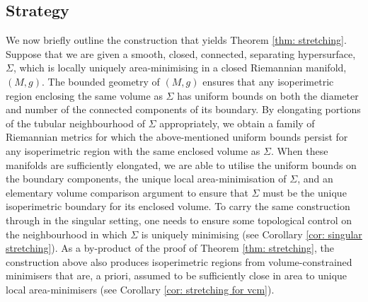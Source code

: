\documentclass[12pt]{article}
\begin{document}
\subsection{Strategy}

We now briefly outline the construction that yields Theorem \ref{thm: stretching}. Suppose that we are given a smooth, closed, connected, separating hypersurface, $\Sigma$, which is locally uniquely area-minimising in a closed Riemannian manifold, $(M,g)$. The bounded geometry of $(M,g)$ ensures that any isoperimetric region enclosing the same volume as $\Sigma$ has uniform bounds on both the diameter and number of the connected components of its boundary. By elongating portions of the tubular neighbourhood of $\Sigma$ appropriately, we obtain a family of Riemannian metrics for which the above-mentioned uniform bounds persist for any isoperimetric region with the same enclosed volume as $\Sigma$. When these manifolds are sufficiently elongated, we are able to utilise the uniform bounds on the boundary components, the unique local area-minimisation of $\Sigma$, and an elementary volume comparison argument to ensure that $\Sigma$ must be the unique isoperimetric boundary for its enclosed volume.
To carry the same construction through in the singular setting, one needs to ensure some topological control on the neighbourhood in which $\Sigma$ is uniquely minimising (see Corollary \ref{cor: singular stretching}). As a by-product of the proof of Theorem \ref{thm: stretching}, the construction above also produces isoperimetric regions from volume-constrained minimisers that are, a priori, assumed to be sufficiently close in area to unique local area-minimisers (see Corollary \ref{cor: stretching for vcm}).
\end{document}
